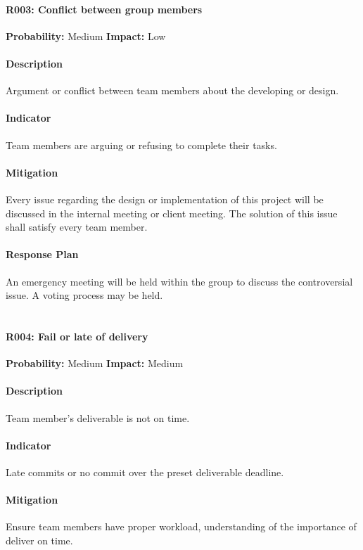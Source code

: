 \documentclass[11pt, a4paper]{report}
\begin{document}
	\paragraph{R003: Conflict between group members} \hspace{1cm} \textbf{Probability: }Medium\hspace{1cm}   \textbf{Impact: }Low
	\paragraph{Description}Argument or conflict between team members about the developing or design. 
	\paragraph{Indicator}Team members are arguing or refusing to complete their tasks.
	\paragraph{Mitigation}Every issue regarding the design or implementation of this project will be discussed in the internal meeting or client meeting. The solution of this issue shall satisfy every team member.
	\paragraph{Response Plan}An emergency meeting will be held within the group to discuss the controversial issue. A voting process may be held.\\\\

	\paragraph{R004: Fail or late of delivery} \hspace{1cm} \textbf{Probability: }Medium\hspace{1cm}   \textbf{Impact: }Medium
	\paragraph{Description}Team member's deliverable is not on time.
	\paragraph{Indicator}Late commits or no commit over the preset deliverable deadline.
	\paragraph{Mitigation}Ensure team members have proper workload, understanding of the importance of deliver on time. 
\end{document}
